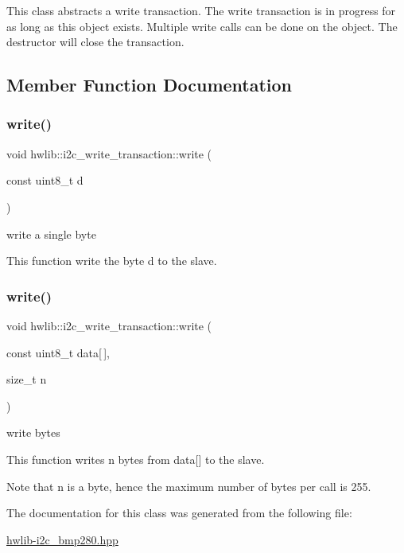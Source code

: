 This class abstracts a write transaction. The write transaction is in progress for as long as this object exists. Multiple write calls can be done on the object. The destructor will close the transaction. 

\subsection{Member Function Documentation}
\mbox{\label{classhwlib_1_1i2c__write__transaction_a15fdb954f92b784f2d723892b57f6728}} 
\subsubsection{\texorpdfstring{write()}{write()}\hspace{0.1cm}{\footnotesize\ttfamily [1/2]}}
{\footnotesize\ttfamily void hwlib\+::i2c\+\_\+write\+\_\+transaction\+::write (\begin{DoxyParamCaption}\item[{const uint8\+\_\+t}]{d }\end{DoxyParamCaption})\hspace{0.3cm}{\ttfamily [inline]}}

write a single byte

This function write the byte d to the slave. \mbox{\label{classhwlib_1_1i2c__write__transaction_a518cffb445b15fc027d2689f17ef45e8}} 
\subsubsection{\texorpdfstring{write()}{write()}\hspace{0.1cm}{\footnotesize\ttfamily [2/2]}}
{\footnotesize\ttfamily void hwlib\+::i2c\+\_\+write\+\_\+transaction\+::write (\begin{DoxyParamCaption}\item[{const uint8\+\_\+t}]{data\mbox{[}$\,$\mbox{]},  }\item[{size\+\_\+t}]{n }\end{DoxyParamCaption})\hspace{0.3cm}{\ttfamily [inline]}}

write bytes

This function writes n bytes from data\mbox{[}\mbox{]} to the slave.

Note that n is a byte, hence the maximum number of bytes per call is 255. 

The documentation for this class was generated from the following file\+:\begin{DoxyCompactItemize}
\item 
\mbox{\hyperlink{hwlib-i2c__bmp280_8hpp}{hwlib-\/i2c\+\_\+bmp280.\+hpp}}\end{DoxyCompactItemize}
